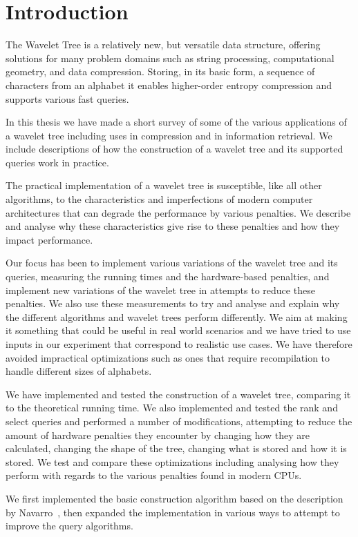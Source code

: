 \section{Introduction}
The Wavelet Tree is a relatively new, but versatile data structure, offering solutions for many problem domains such as string processing, computational geometry, and data compression.
Storing, in its basic form, a sequence of characters from an alphabet it enables higher-order entropy compression and supports various fast queries.

In this thesis we have made a short survey of some of the various applications of a wavelet tree including uses in compression and in information retrieval.
We include descriptions of how the construction of a wavelet tree and its supported queries work in practice.

The practical implementation of a wavelet tree is susceptible, like all other algorithms, to the characteristics and imperfections of modern computer architectures that can degrade the performance by various penalties.
We describe and analyse why these characteristics give rise to these penalties and how they impact performance.

Our focus has been to implement various variations of the wavelet tree and its queries, measuring the running times and the hardware-based penalties, and implement new variations of the wavelet tree in attempts to reduce these penalties.
We also use these measurements to try and analyse and explain why the different algorithms and wavelet trees perform differently.
We aim at making it something that could be useful in real world scenarios and we have tried to use inputs in our experiment that correspond to realistic use cases.
We have therefore avoided impractical optimizations such as ones that require recompilation to handle different sizes of alphabets.

We have implemented and tested the construction of a wavelet tree, comparing it to the theoretical running time.
We also implemented and tested the rank and select queries and performed a number of modifications, attempting to reduce the amount of hardware penalties they encounter by changing how they are calculated, changing the shape of the tree, changing what is stored and how it is stored.
We test and compare these optimizations including analysing how they perform with regards to the various penalties found in modern CPUs.

We first implemented the basic construction algorithm based on the description by Navarro~, then expanded the implementation in various ways to attempt to improve the query algorithms.

